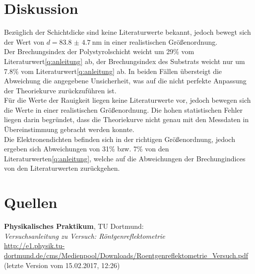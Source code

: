 \documentclass[captions=tableheading]{scrartcl}
\begin{document}
\section{Diskussion}
Bezüglich der Schichtdicke sind keine Literaturwerte bekannt, jedoch bewegt sich der Wert von $d=\SI{83.8(47)}{\nano \metre}$ in einer realistischen Größenordnung. \\
Der Brechungsindex der Polystyrolschicht weicht um 29\% vom Literaturwert\ref{q:anleitung} ab, der Brechungsindex des Substrats weicht nur um 7.8\% vom Literaturwert\ref{q:anleitung} ab. In beiden Fällen übersteigt die Abweichung die angegebene Unsicherheit, was auf die nicht perfekte Anpassung der Theoriekurve zurückzuführen ist. \\
Für die Werte der Rauigkeit liegen keine Literaturwerte vor, jedoch bewegen sich die Werte in einer realistischen Größenordnung. Die hohen statistischen Fehler liegen darin begründet, dass die Theoriekurve nicht genau mit den Messdaten in Übereinstimmung gebracht werden konnte. \\
Die Elektronendichten befinden sich in der richtigen Größenordnung, jedoch ergeben sich Abweichungen von 31\% bzw. 7\% von den Literaturwerten\ref{q:anleitung}, welche auf die Abweichungen der Brechungindices von den Literaturwerten zurückgehen.

\section{Quellen}
\begin{enumerate}[label={[\arabic*]}]
\item \label{q:anleitung} \textbf{Physikalisches Praktikum}, TU Dortmund: \\
\textit{Versuchsanleitung zu Versuch: Röntgenreflektometrie} \\
\url{http://e1.physik.tu-dortmund.de/cms/Medienpool/Downloads/Roentgenreflektometrie_Versuch.pdf} (letzte Version vom 15.02.2017, 12:26)
\end{enumerate}
\end{document}
